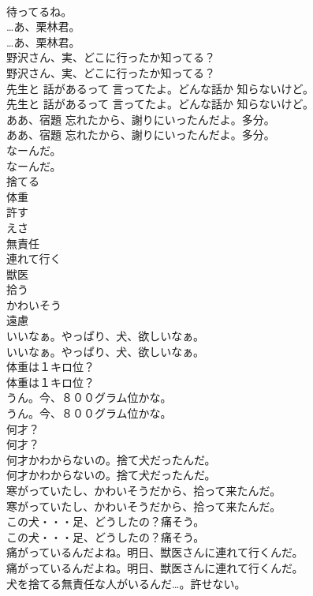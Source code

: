 \documentclass[8pt]{extreport}
\begin{document}
\begin{CJK}{UTF8}{min}
\\	待ってるね。 
\\	…あ、栗林君。	
\\	…あ、栗林君。 
\\	野沢さん、実、どこに行ったか知ってる？	
\\	野沢さん、実、どこに行ったか知ってる？ 
\\	先生と 話があるって 言ってたよ。どんな話か 知らないけど。	
\\	先生と 話があるって 言ってたよ。どんな話か 知らないけど。 
\\	ああ、宿題 忘れたから、謝りにいったんだよ。多分。	
\\	ああ、宿題 忘れたから、謝りにいったんだよ。多分。 
\\	なーんだ。	
\\	なーんだ。 
\\	捨てる
\\	体重
\\	許す
\\	えさ
\\	無責任
\\	連れて行く
\\	獣医
\\	拾う
\\	かわいそう
\\	遠慮
\\	いいなぁ。やっぱり、犬、欲しいなぁ。	
\\	いいなぁ。やっぱり、犬、欲しいなぁ。 
\\	体重は１キロ位？	
\\	体重は１キロ位？ 
\\	うん。今、８００グラム位かな。	
\\	うん。今、８００グラム位かな。 
\\	何才？	
\\	何才？ 
\\	何才かわからないの。捨て犬だったんだ。	
\\	何才かわからないの。捨て犬だったんだ。 
\\	寒がっていたし、かわいそうだから、拾って来たんだ。	
\\	寒がっていたし、かわいそうだから、拾って来たんだ。 
\\	この犬・・・足、どうしたの？痛そう。	
\\	この犬・・・足、どうしたの？痛そう。 
\\	痛がっているんだよね。明日、獣医さんに連れて行くんだ。	
\\	痛がっているんだよね。明日、獣医さんに連れて行くんだ。 
\\	犬を捨てる無責任な人がいるんだ…。許せない。	

\end{CJK}
\end{document}
